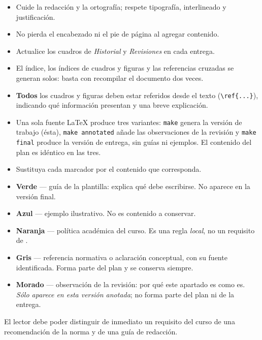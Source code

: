 
\thispagestyle{uvestilo}

\begin{instruccion}
\begin{itemize}
  \item Cuide la redacción y la ortografía; respete tipografía, interlineado y justificación.
  \item No pierda el encabezado ni el pie de página al agregar contenido.
  \item Actualice los cuadros de \emph{Historial} y \emph{Revisiones} en cada entrega.
  \item El índice, los índices de cuadros y figuras y las referencias cruzadas se generan
        solos: basta con recompilar el documento dos veces.
  \item \textbf{Todos} los cuadros y figuras deben estar referidos desde el texto
        (\texttt{\textbackslash ref\{...\}}), indicando qué información presentan y una
        breve explicación.
  \item Una sola fuente LaTeX produce tres variantes: \texttt{make} genera la versión de
        trabajo (ésta), \texttt{make annotated} añade las observaciones de la revisión y
        \texttt{make final} produce la versión de entrega, sin guías ni ejemplos. El contenido
        del plan es idéntico en las tres.
  \item Sustituya cada marcador  por el contenido que corresponda.
\end{itemize}
\end{instruccion}

\ifversionfinal\else
\begin{notanormativa}
\begin{itemize}
  \item \textcolor{instrverde}{\textbf{Verde}} — guía de la plantilla: explica qué debe
        escribirse. No aparece en la versión final.
  \item \textcolor{ejemazul}{\textbf{Azul}} — ejemplo ilustrativo. No es contenido a conservar.
  \item \textcolor{polinaranja}{\textbf{Naranja}} — política académica del curso.
        Es una regla \emph{local}, no un requisito de \norma.
  \item \textcolor{normgris}{\textbf{Gris}} — referencia normativa o aclaración conceptual,
        con su fuente identificada. Forma parte del plan y se conserva siempre.
  \ifmostrarobservaciones
  \item \textcolor{obsmorado}{\textbf{Morado}} — observación de la revisión: por qué este
        apartado es como es. \emph{Sólo aparece en esta versión anotada}; no forma parte del
        plan ni de la entrega.
  \fi
\end{itemize}
El lector debe poder distinguir de inmediato un requisito del curso de una recomendación de la
norma y de una guía de redacción.
\end{notanormativa}
\fi

